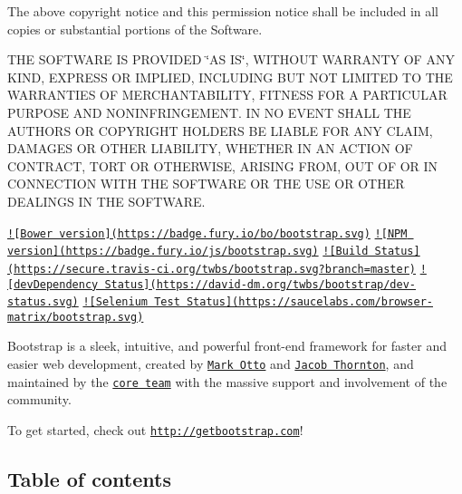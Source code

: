 The above copyright notice and this permission notice shall be included in all copies or substantial portions of the Software.

T\-H\-E S\-O\-F\-T\-W\-A\-R\-E I\-S P\-R\-O\-V\-I\-D\-E\-D \char`\"{}\-A\-S I\-S\char`\"{}, W\-I\-T\-H\-O\-U\-T W\-A\-R\-R\-A\-N\-T\-Y O\-F A\-N\-Y K\-I\-N\-D, E\-X\-P\-R\-E\-S\-S O\-R I\-M\-P\-L\-I\-E\-D, I\-N\-C\-L\-U\-D\-I\-N\-G B\-U\-T N\-O\-T L\-I\-M\-I\-T\-E\-D T\-O T\-H\-E W\-A\-R\-R\-A\-N\-T\-I\-E\-S O\-F M\-E\-R\-C\-H\-A\-N\-T\-A\-B\-I\-L\-I\-T\-Y, F\-I\-T\-N\-E\-S\-S F\-O\-R A P\-A\-R\-T\-I\-C\-U\-L\-A\-R P\-U\-R\-P\-O\-S\-E A\-N\-D N\-O\-N\-I\-N\-F\-R\-I\-N\-G\-E\-M\-E\-N\-T. I\-N N\-O E\-V\-E\-N\-T S\-H\-A\-L\-L T\-H\-E A\-U\-T\-H\-O\-R\-S O\-R C\-O\-P\-Y\-R\-I\-G\-H\-T H\-O\-L\-D\-E\-R\-S B\-E L\-I\-A\-B\-L\-E F\-O\-R A\-N\-Y C\-L\-A\-I\-M, D\-A\-M\-A\-G\-E\-S O\-R O\-T\-H\-E\-R L\-I\-A\-B\-I\-L\-I\-T\-Y, W\-H\-E\-T\-H\-E\-R I\-N A\-N A\-C\-T\-I\-O\-N O\-F C\-O\-N\-T\-R\-A\-C\-T, T\-O\-R\-T O\-R O\-T\-H\-E\-R\-W\-I\-S\-E, A\-R\-I\-S\-I\-N\-G F\-R\-O\-M, O\-U\-T O\-F O\-R I\-N C\-O\-N\-N\-E\-C\-T\-I\-O\-N W\-I\-T\-H T\-H\-E S\-O\-F\-T\-W\-A\-R\-E O\-R T\-H\-E U\-S\-E O\-R O\-T\-H\-E\-R D\-E\-A\-L\-I\-N\-G\-S I\-N T\-H\-E S\-O\-F\-T\-W\-A\-R\-E.

\href{http://badge.fury.io/bo/bootstrap}{\tt !\mbox{[}Bower version\mbox{]}(https\-://badge.\-fury.\-io/bo/bootstrap.\-svg)} \href{http://badge.fury.io/js/bootstrap}{\tt !\mbox{[}N\-P\-M version\mbox{]}(https\-://badge.\-fury.\-io/js/bootstrap.\-svg)} \href{https://travis-ci.org/twbs/bootstrap}{\tt !\mbox{[}Build Status\mbox{]}(https\-://secure.\-travis-\/ci.\-org/twbs/bootstrap.\-svg?branch=master)} \href{https://david-dm.org/twbs/bootstrap#info=devDependencies}{\tt !\mbox{[}dev\-Dependency Status\mbox{]}(https\-://david-\/dm.\-org/twbs/bootstrap/dev-\/status.\-svg)} \href{https://saucelabs.com/u/bootstrap}{\tt !\mbox{[}Selenium Test Status\mbox{]}(https\-://saucelabs.\-com/browser-\/matrix/bootstrap.\-svg)}

Bootstrap is a sleek, intuitive, and powerful front-\/end framework for faster and easier web development, created by \href{https://twitter.com/mdo}{\tt Mark Otto} and \href{https://twitter.com/fat}{\tt Jacob Thornton}, and maintained by the \href{https://github.com/twbs?tab=members}{\tt core team} with the massive support and involvement of the community.

To get started, check out \href{http://getbootstrap.com}{\tt http\-://getbootstrap.\-com}!

\subsection*{Table of contents}



